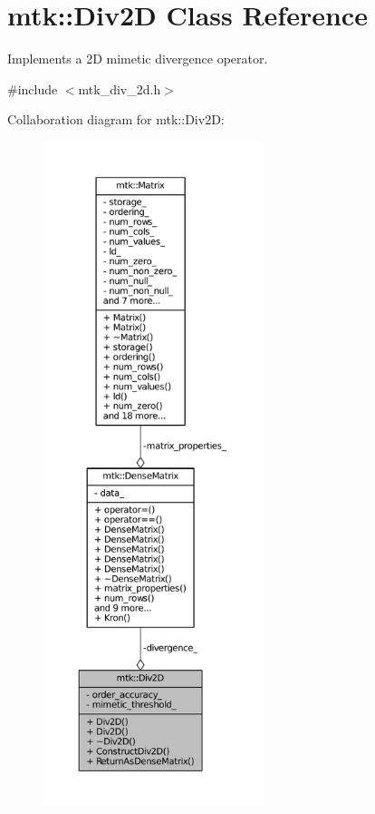 \hypertarget{classmtk_1_1Div2D}{\section{mtk\+:\+:Div2\+D Class Reference}
\label{classmtk_1_1Div2D}
}


Implements a 2\+D mimetic divergence operator.  




{\ttfamily \#include $<$mtk\+\_\+div\+\_\+2d.\+h$>$}



Collaboration diagram for mtk\+:\+:Div2\+D\+:\nopagebreak
\begin{figure}[H]
\begin{center}
\leavevmode
\includegraphics[height=550pt]{classmtk_1_1Div2D__coll__graph}
\end{center}
\end{figure}
